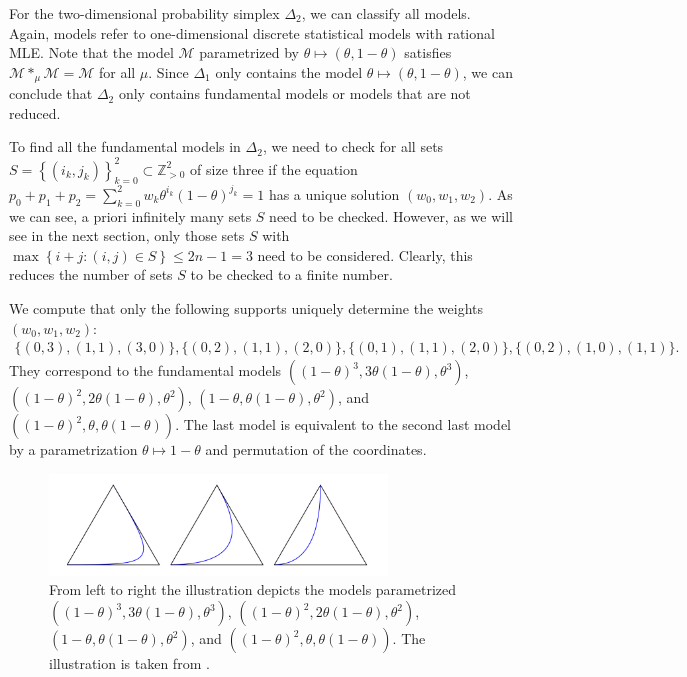 \begin{example}
For the two-dimensional probability simplex \( \Delta_2 \), we can classify all models. Again, models refer to one-dimensional discrete statistical models with rational MLE. Note that the model \( \mathcal{M} \) parametrized by \( \theta \mapsto (\theta, 1-\theta) \) satisfies \( \mathcal{M} *_\mu \mathcal{M} = \mathcal{M} \) for all \( \mu \). Since \( \Delta_1 \) only contains the model \( \theta \mapsto (\theta, 1-\theta) \), we can conclude that \( \Delta_2 \) only contains fundamental models or models that are not reduced.

To find all the fundamental models in \( \Delta_2 \), we need to check for all sets \( S = \left\{ (i_k,j_k)\right\}_{k=0}^2 \subset \mathbb{Z}^2_{>0} \) of size three if the equation \( p_0 + p_1 + p_2 = \sum_{k=0}^2 w_k \theta^{i_k}(1-\theta)^{j_k} = 1 \) has a unique solution \( (w_0, w_1, w_2) \). As we can see, a priori infinitely many sets \( S \) need to be checked. However, as we will see in the next section, only those sets \( S \) with \( \max\left\{ i+j : (i,j) \in S \right\} \leq 2n -1 = 3 \) need to be considered. Clearly, this reduces the number of sets \( S \) to be checked to a finite number.

We compute that only the following supports uniquely determine the weights \( (w_0, w_1, w_2) \):
\begin{align*}
    \{ (0,3), (1,1), (3,0) \} , \{ (0,2), (1,1), (2,0) \}, \{ (0,1), (1,1), (2,0) \}, \{ (0,2),(1,0),(1,1) \}.
\end{align*}
They correspond to the fundamental models \( ((1-\theta)^3, 3\theta(1-\theta), \theta^3) \), \( ((1-\theta)^2, 2\theta(1-\theta), \theta^2) \), \( (1-\theta, \theta(1-\theta), \theta^2) \), and \( ((1-\theta)^2, \theta, \theta(1-\theta)) \). The last model is equivalent to the second last model by a parametrization \( \theta \mapsto 1-\theta \) and permutation of the coordinates.

\begin{figure}[H]
    \centering
    \includegraphics[width=0.8\textwidth]{assets/fundamental-models-delta-2.png}
    \caption{From left to right the illustration depicts the models parametrized \( ((1-\theta)^3, 3\theta(1-\theta), \theta^3) \), \( ((1-\theta)^2, 2\theta(1-\theta), \theta^2) \), \( (1-\theta, \theta(1-\theta), \theta^2) \), and \( ((1-\theta)^2, \theta, \theta(1-\theta)) \). The illustration is taken from \cite{bik2022classifying}.}
\end{figure}


\end{example}
